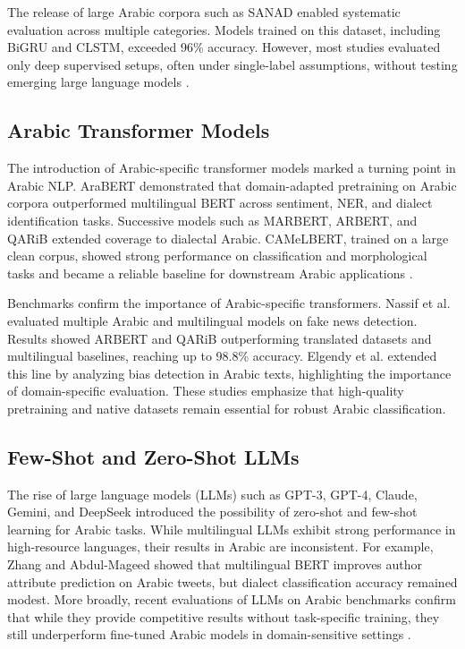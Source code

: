 \documentclass[preprint,12pt,authoryear]{elsarticle}
\begin{document}
The release of large Arabic corpora such as SANAD \cite{elnagar2020arabic} enabled systematic evaluation across multiple categories. Models trained on this dataset, including BiGRU and CLSTM, exceeded 96\% accuracy. However, most studies evaluated only deep supervised setups, often under single-label assumptions, without testing emerging large language models \cite{rifai2021arabic,el2022arabic}.


\subsection{Arabic Transformer Models}
The introduction of Arabic-specific transformer models marked a turning point in Arabic NLP. AraBERT \cite{helwe2020semi} demonstrated that domain-adapted pretraining on Arabic corpora outperformed multilingual BERT across sentiment, NER, and dialect identification tasks. Successive models such as MARBERT, ARBERT, and QARiB extended coverage to dialectal Arabic. CAMeLBERT, trained on a large clean corpus, showed strong performance on classification and morphological tasks and became a reliable baseline for downstream Arabic applications \cite{yagi2021evaluation,elnagar2023benchmark,nassif2022arabic}.

Benchmarks confirm the importance of Arabic-specific transformers. Nassif et al. \cite{nassif2022arabic} evaluated multiple Arabic and multilingual models on fake news detection. Results showed ARBERT and QARiB outperforming translated datasets and multilingual baselines, reaching up to 98.8\% accuracy. Elgendy et al. \cite{elgendy2024toxicity} extended this line by analyzing bias detection in Arabic texts, highlighting the importance of domain-specific evaluation. These studies emphasize that high-quality pretraining and native datasets remain essential for robust Arabic classification.

\subsection{Few-Shot and Zero-Shot LLMs}
The rise of large language models (LLMs) such as GPT-3, GPT-4, Claude, Gemini, and DeepSeek introduced the possibility of zero-shot and few-shot learning for Arabic tasks. While multilingual LLMs exhibit strong performance in high-resource languages, their results in Arabic are inconsistent. For example, Zhang and Abdul-Mageed \cite{zhang2019bert} showed that multilingual BERT improves author attribute prediction on Arabic tweets, but dialect classification accuracy remained modest. More broadly, recent evaluations of LLMs on Arabic benchmarks confirm that while they provide competitive results without task-specific training, they still underperform fine-tuned Arabic models in domain-sensitive settings \cite{baniata2023transformer,hossain2024transnet}.
\end{document}
